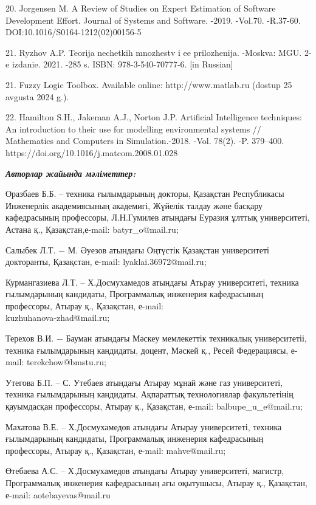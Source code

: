 \begin{noparindent}
20. Jorgensen M. A Review of Studies on Expert Estimation of Software
Development Effort. Journal of Systems and Software. -2019. -Vol.70.
-R.37-60. DOI:10.1016/S0164-1212(02)00156-5

21. Ryzhov A.P. Teorija nechetkih mnozhestv i ee prilozhenija. -Moskva:
MGU. 2-e izdanie. 2021. -285 s. ISBN: 978-3-540-70777-6. {[}in
Russian{]}

21. Fuzzy Logic Toolbox. Available online: http://www.matlab.ru (dostup
25 avgusta 2024 g.).

22. Hamilton S.H., Jakeman A.J., Norton J.P. Artificial Intelligence
techniques: An introduction to their use for modelling environmental
systems // Mathematics and Computers in Simulation.-2018. -Vol. 78(2).
-P. 379--400. https://doi.org/10.1016/j.matcom.2008.01.028
\end{noparindent}

\emph{{\bfseries Авторлар жайында мәліметтер:}}
\begin{noparindent}

Оразбаев Б.Б. -- техника ғылымдарының докторы, Қазақстан Республикасы
Инженерлік академиясының академигі, Жүйелік талдау және басқару
кафедрасының профессоры, Л.Н.Гумилев атындағы Еуразия ұлттық
университеті, Астана қ., Қазақстан,е-mail: batyr\_o@mail.ru;

Салыбек Л.Т. − М. Әуезов атындағы Оңтүстік Қазақстан университеті
докторанты, Қазақстан, е-mail: lyaklai.36972@mail.ru;

Курмангазиева Л.Т. -- Х.Досмухамедов атындағы Атьрау университеті,
техника ғылымдарының кандидаты, Программалық инженерия кафедрасының
профессоры, Атырау қ., Қазақстан, е-mail: \\ kuzhuhanova-zhad@mail.ru;

Терехов В.И. − Бауман атындағы Мәскеу мемлекеттік техникалық
университетіі, техника ғылымдарының кандидаты, доцент, Мәскей қ., Ресей
Федерациясы, е-mail: terekchow@bmstu.ru;

Утегова Б.П. -- С. Утебаев атындағы Атырау мұнай және газ университеті,
техника ғылымдарының кандидаты, Ақпараттық технологиялар факультетінің
қауымдасқан профессоры, Атырау қ., Қазақстан, е-mail:
balbupe\_u\_e@mail.ru;

Махатова В.Е. -- Х.Досмухамедов атындағы Атырау университеті, техника
ғылымдарының кандидаты, Программалық инженерия кафедрасының профессоры,
Атырау қ., Қазақстан, е-mail: mahve@mail.ru;

Өтебаева А.С. -- Х.Досмухамедов атындағы Атырау университеті, магистр,
Программалық инженерия кафедрасының ағы оқытушысы, Атырау қ., Қазақстан,
е-mail: aotebayevas@mail.ru
\end{noparindent}

